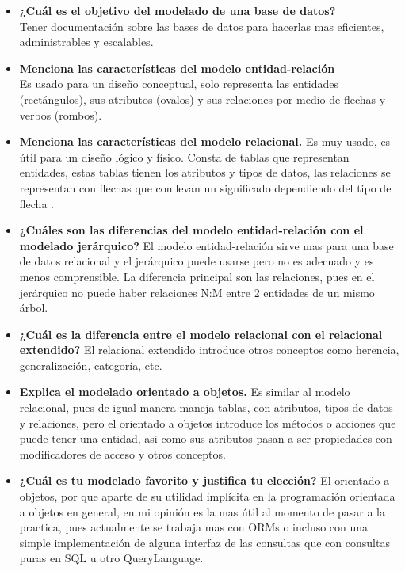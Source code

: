 \documentclass[spanish,12pt,letterpapper]{article}
\begin{document}
	\begin{itemize}
	
\item \textbf{¿Cuál es el objetivo del modelado de una base de datos?\\}
Tener documentación sobre las bases de datos para hacerlas mas eficientes, administrables y escalables.\\
	
\item \textbf{Menciona las características del modelo entidad-relación\\}
Es usado para un diseño conceptual, solo representa las entidades (rectángulos), sus atributos (ovalos) y sus relaciones por medio de flechas y verbos (rombos).\\

\item \textbf{Menciona las características del modelo relacional.}
Es muy usado, es útil para un diseño lógico y físico. Consta de tablas que representan entidades, estas tablas tienen los atributos y tipos de datos, las relaciones se representan con flechas que conllevan un significado dependiendo del tipo de flecha .\\

\item \textbf{¿Cuáles son las diferencias del modelo entidad-relación con el modelado jerárquico?}
El modelo entidad-relación sirve mas para una base de datos relacional y el jerárquico puede usarse pero no es adecuado y es menos comprensible. La diferencia principal son las relaciones, pues en el jerárquico no puede haber relaciones N:M entre 2 entidades de un mismo árbol.\\

\item \textbf{¿Cuál es la diferencia entre el modelo relacional con el relacional extendido?}
El relacional extendido introduce otros conceptos como herencia, generalización, categoría, etc.\\

\item \textbf{Explica el modelado orientado a objetos.}
Es similar al modelo relacional, pues de igual manera maneja tablas, con atributos, tipos de datos y relaciones, pero el orientado a objetos introduce los métodos o acciones que puede tener una entidad, asi como sus atributos pasan a ser propiedades con modificadores de acceso y otros conceptos.\\

\item \textbf{¿Cuál es tu modelado favorito y justifica tu elección?}
El orientado a objetos, por que aparte de su utilidad implícita en la programación orientada a objetos en general, en mi opinión es la mas útil al momento de pasar a la practica, pues actualmente se trabaja mas con ORMs o incluso con una simple implementación de alguna interfaz de las consultas que con consultas puras en SQL u otro QueryLanguage.\\
    

\end{itemize}
\end{document}
